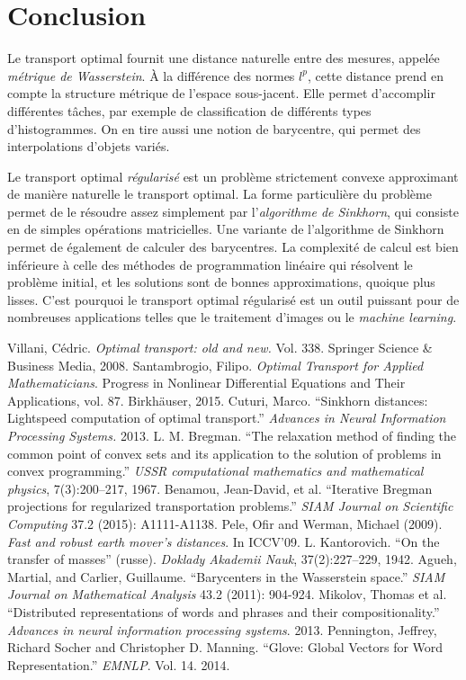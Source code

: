 \section{Conclusion}

Le transport optimal fournit une distance naturelle entre des mesures, appelée \emph{métrique de Wasserstein}. À la différence des normes $l^p$, cette distance prend en compte la structure métrique de l'espace sous-jacent. Elle permet d'accomplir différentes tâches, par exemple de classification de différents types d'histogrammes. On en tire aussi une notion de barycentre, qui permet des interpolations d'objets variés.

Le transport optimal \emph{régularisé} est un problème strictement convexe approximant de manière naturelle le transport optimal. La forme particulière du problème permet de le résoudre assez simplement par l'\emph{algorithme de Sinkhorn}, qui consiste en de simples opérations matricielles.
Une variante de l'algorithme de Sinkhorn permet de également de calculer des barycentres.
La complexité de calcul est bien inférieure à celle des méthodes de programmation linéaire qui résolvent le problème initial, et les solutions sont de bonnes approximations, quoique plus lisses.
C'est pourquoi le transport optimal régularisé est un outil puissant pour de nombreuses applications telles que le traitement d'images ou le \emph{machine learning}.

\medskip
\begin{thebibliography}{99}
Villani, Cédric. \textit{Optimal transport: old and new.} Vol. 338. Springer Science \& Business Media, 2008.
Santambrogio, Filipo. \textit{Optimal Transport for Applied Mathematicians}. Progress in Nonlinear Differential Equations and Their Applications, vol. 87. Birkhäuser, 2015.
Cuturi, Marco. ``Sinkhorn distances: Lightspeed computation of optimal transport.'' \textit{Advances in Neural Information Processing Systems.} 2013.
L. M. Bregman. ``The relaxation method of finding the common point of
convex sets and its application to the solution of problems in convex programming.''
\textit{USSR computational mathematics and mathematical physics},
7(3):200–217, 1967.
Benamou, Jean-David, et al. ``Iterative Bregman projections for regularized transportation problems.'' \textit{SIAM Journal on Scientific Computing} 37.2 (2015): A1111-A1138.
Pele, Ofir and Werman, Michael (2009). \textit{Fast and robust earth mover’s distances}. In ICCV’09.
L. Kantorovich. ``On the transfer of masses'' (russe). \textit{Doklady Akademii
Nauk}, 37(2):227–229, 1942.
Agueh, Martial, and Carlier, Guillaume. ``Barycenters in the Wasserstein space.'' \textit{SIAM Journal on Mathematical Analysis} 43.2 (2011): 904-924.
Mikolov, Thomas et al. ``Distributed representations of words and phrases and their compositionality.'' \textit{Advances in neural information processing systems}. 2013.
Pennington, Jeffrey, Richard Socher and Christopher D. Manning. ``Glove: Global Vectors for Word Representation.'' \textit{EMNLP}. Vol. 14. 2014.
\end{thebibliography}

